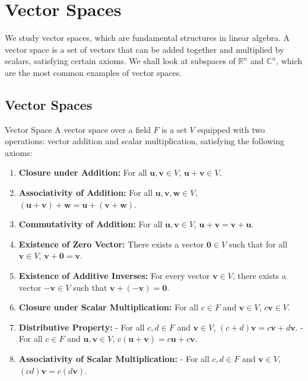 \documentclass[openany]{book}
\begin{document}
\section{Vector Spaces}
We study vector spaces, which are fundamental structures in linear algebra. A vector space is a set of vectors that can be added together and multiplied by scalars, satisfying certain axioms. We shall look at subspaces of $\mathbb{R}^n$ and $\mathbb{C}^n$, which are the most common examples of vector spaces.
\subsection{Vector Spaces}
\begin{mydefinition}{Vector Space}
A vector space over a field $F$ is a set $V$ equipped with two operations: vector addition and scalar multiplication, satisfying the following axioms:
\begin{enumerate}
    \item \textbf{Closure under Addition:} For all $\mathbf{u}, \mathbf{v} \in V$, $\mathbf{u} + \mathbf{v} \in V$.
    \item \textbf{Associativity of Addition:} For all $\mathbf{u}, \mathbf{v}, \mathbf{w} \in V$, $(\mathbf{u} + \mathbf{v}) + \mathbf{w} = \mathbf{u} + (\mathbf{v} + \mathbf{w})$.
    \item \textbf{Commutativity of Addition:} For all $\mathbf{u}, \mathbf{v} \in V$, $\mathbf{u} + \mathbf{v} = \mathbf{v} + \mathbf{u}$.
    \item \textbf{Existence of Zero Vector:} There exists a vector $\mathbf{0} \in V$ such that for all $\mathbf{v} \in V$, $\mathbf{v} + \mathbf{0} = \mathbf{v}$.
    \item \textbf{Existence of Additive Inverses:} For every vector $\mathbf{v} \in V$, there exists a vector $-\mathbf{v} \in V$ such that $\mathbf{v} + (-\mathbf{v}) = \mathbf{0}$.
    \item \textbf{Closure under Scalar Multiplication:} For all $c \in F$ and $\mathbf{v} \in V$, $c\mathbf{v} \in V$.
    \item \textbf{Distributive Property:}
        - For all $c, d \in F$ and $\mathbf{v} \in V$, $(c + d)\mathbf{v} = c\mathbf{v} + d\mathbf{v}$.
        - For all $c \in F$ and $\mathbf{u}, \mathbf{v} \in V$, $c(\mathbf{u} + \mathbf{v}) = c\mathbf{u} + c\mathbf{v}$.
    \item 	\textbf{Associativity of Scalar Multiplication:}
        - For all $c, d \in F$ and $\mathbf{v} \in V$, $(cd)\mathbf{v} = c(d\mathbf{v})$.
\end{enumerate}
\end{mydefinition}
\end{document}
